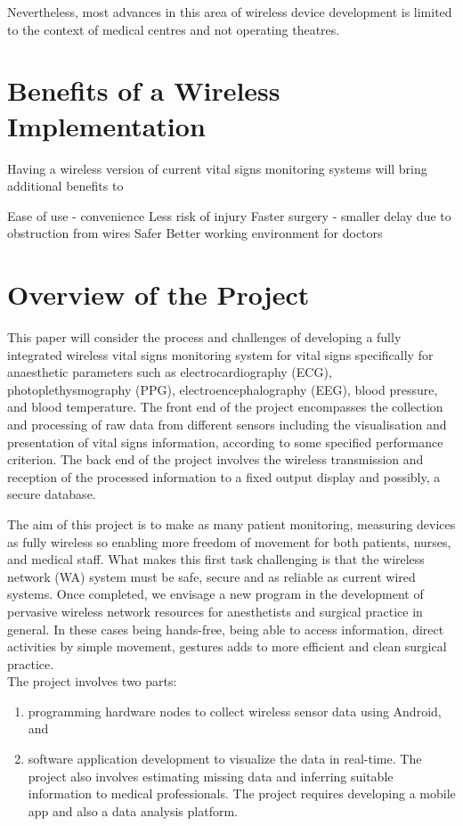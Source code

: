 Nevertheless, most advances in this area of wireless device development is limited to the context of medical centres and not operating theatres.  

\section{Benefits of a Wireless Implementation}

Having a wireless version of current vital signs monitoring systems will bring additional benefits to 


Ease of use - convenience
Less risk of injury
Faster surgery - smaller delay due to obstruction from wires
Safer
Better working environment for doctors

\section{Overview of the Project}

This  paper will  consider the  process and challenges of  developing a fully integrated wireless vital signs monitoring system for vital signs specifically for anaesthetic parameters such as electrocardiography (ECG), photoplethysmography (PPG), electroencephalography (EEG), blood pressure, and blood temperature. The  front end of the project encompasses the collection and processing of raw data from different sensors including the visualisation and presentation of vital signs information,  according  to some specified performance criterion. The back end of the project involves the wireless transmission and reception of the processed information to a fixed output display and possibly, a secure database. 

The aim of this project is to make as many patient monitoring, measuring devices as fully wireless so enabling more freedom of movement for both patients, nurses, and medical staff. What makes this first task challenging is that the wireless network (WA) system must be safe, secure and as reliable as current wired systems. Once completed, we envisage a new program in the development of pervasive wireless network resources for anesthetists and surgical practice in general. In these cases being hands-free, being able to access information, direct activities by simple movement, gestures adds to more efficient and clean surgical practice. \\

The project involves two parts: 

\begin{enumerate}
	\item programming hardware nodes to collect wireless sensor data using Android, and 
	
	\item software application development to visualize the data in real-time. The project also involves estimating missing data and inferring suitable information to medical professionals. The project requires developing a mobile app and also a data analysis platform.
\end{enumerate}


